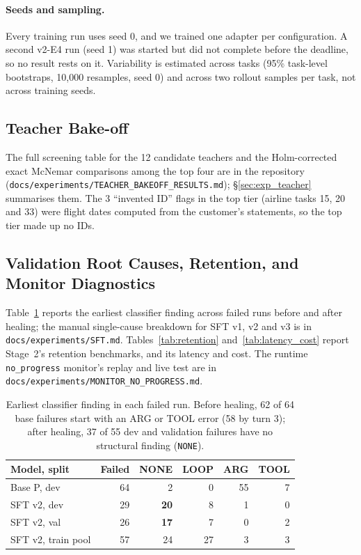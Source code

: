 \documentclass[11pt]{article}
\begin{document}
\paragraph{Seeds and sampling.} Every training run uses seed 0, and we trained one adapter per configuration. A second v2-E4 run (seed 1) was started but did not complete before the deadline, so no result rests on it. Variability is estimated across tasks (95\% task-level bootstraps, 10,000 resamples, seed 0) and across two rollout samples per task, not across training seeds.

\subsection{Teacher Bake-off}
\label{app:bakeoff}
The full screening table for the 12 candidate teachers and the Holm-corrected exact McNemar comparisons among the top four are in the repository (\texttt{docs/experiments/TEACHER\_BAKEOFF\_RESULTS.md}); \S\ref{sec:exp_teacher} summarises them. The 3 ``invented ID'' flags in the top tier (airline tasks 15, 20 and 33) were flight dates computed from the customer's statements, so the top tier made up no IDs.

\subsection{Validation Root Causes, Retention, and Monitor Diagnostics}
Table~\ref{tab:failure_shift} reports the earliest classifier finding across failed runs before and after healing; the manual single-cause breakdown for SFT v1, v2 and v3 is in \texttt{docs/experiments/SFT.md}. Tables~\ref{tab:retention} and~\ref{tab:latency_cost} report Stage~2's retention benchmarks, and its latency and cost. The runtime \texttt{no\_progress} monitor's replay and live test are in \texttt{docs/experiments/MONITOR\_NO\_PROGRESS.md}.

\begin{table}[h]
\centering
\footnotesize
\setlength{\tabcolsep}{3pt}
\begin{tabular}{@{}lrrrrr@{}}
\toprule
\textbf{Model, split} & \textbf{Failed} & \textbf{NONE} & \textbf{LOOP} & \textbf{ARG} & \textbf{TOOL} \\
\midrule
Base P, dev & 64 & 2 & 0 & 55 & 7 \\
SFT v2, dev & 29 & \textbf{20} & 8 & 1 & 0 \\
SFT v2, val & 26 & \textbf{17} & 7 & 0 & 2 \\
SFT v2, train pool & 57 & 24 & 27 & 3 & 3 \\
\bottomrule
\end{tabular}
\caption{Earliest classifier finding in each failed run. Before healing, 62 of 64 base failures start with an ARG or TOOL error (58 by turn 3); after healing, 37 of 55 dev and validation failures have no structural finding (\texttt{NONE}).}
\label{tab:failure_shift}
\end{table}
\end{document}
